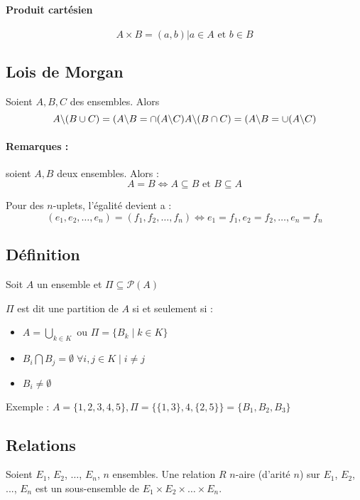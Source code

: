 \documentclass[12pt, a4paper]{report}
\begin{document}
\paragraph{Produit cartésien}
\[ A \times B = {(a, b) | a \in A \text{ et } b \in B} \]

\subsection{Lois de Morgan}
Soient $A, B, C$ des ensembles. Alors
\[
A\backslash(B \cup C) = (A\backslash B=\cap(A\backslash C) \\
A\backslash(B \cap C) = (A\backslash B=\cup(A\backslash C)
\]

\paragraph{Remarques :} soient $A, B$ deux ensembles. Alors :
\[
A=B \Leftrightarrow A\subseteq B \text{ et } B\subseteq A
\]

Pour des $n$-uplets, l'égalité devient a :
\[
(e_1,e_2,\dots,e_n)=(f_1,f_2,\dots,f_n)\Leftrightarrow e_1=f_1,e_2=f_2,\dots,e_n=f_n
\]

\subsection{Définition}


Soit $A$ un ensemble et $\Pi \subseteq \mathcal{P}(A)$

$\Pi$ est dit une partition de $A$ si et seulement si :
\begin{itemize}
\item $A = \bigcup_{k\in K} \text{ ou }\Pi=\{B_k \mid k\in K\}$
\item $B_i\bigcap B_j = \emptyset \; \forall i, j\in K \mid i\neq j$
\item $B_i \neq \emptyset$
\end{itemize}

Exemple : $A=\{1,2,3,4,5\}, \Pi=\{\{1,3\},4,\{2,5\}\} = \{B_1,B_2,B_3\}$

\subsection{Relations}

Soient $E_1$, $E_2$, $\dots$, $E_n$, $n$ ensembles. Une relation $R$
$n$-aire (d'arité $n$) sur $E_1$, $E_2$, ..., $E_n$ est un
sous-ensemble de $E_1 \times E_2 \times \dots \times E_n$.
\end{document}
